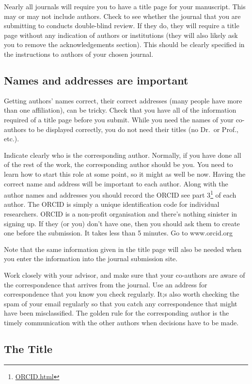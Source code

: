 \documentclass[
]{krantz}
\renewcommand{\href}[2]{#2\footnote{\url{#1}}}
\begin{document}
Nearly all journals will require you to have a title page for your manuscript. This may or may not include authors. Check to see whether the journal that you are submitting to conducts double-blind review. If they do, they will require a title page without any indication of authors or institutions (they will also likely ask you to remove the acknowledgements section). This should be clearly specified in the instructions to authors of your chosen journal.

\hypertarget{ORCID}{%
\subsection{Names and addresses are important}\label{ORCID}}

Getting authors' names correct, their correct addresses (many people have more than one affiliation), can be tricky. Check that you have all of the information required of a title page before you submit. While you need the names of your co-authors to be displayed correctly, you do not need their titles (no Dr.~or Prof., etc.).

Indicate clearly who is the corresponding author. Normally, if you have done all of the rest of the work, the corresponding author should be you. You need to learn how to start this role at some point, so it might as well be now. Having the correct name and address will be important to each author. Along with the author names and addresses you should record the ORCID \href{ORCID.html}{see part 3} of each author. The ORCID is simply a unique identification code for individual researchers. ORCID is a non-profit organisation and there's nothing sinister in signing up. If they (or you) don't have one, then you should ask them to create one before the submission. It takes less than 5 minutes. Go to www.orcid.org

Note that the same information given in the title page will also be needed when you enter the information into the journal submission site.

Work closely with your advisor, and make sure that your co-authors are aware of the correspondence that arrives from the journal. Use an address for correspondence that you know you check regularly. It;s also worth checking the spam of your email regularly so that you catch any correspondence that might have been misclassified. The golden rule for the corresponding author is the timely communication with the other authors when decisions have to be made.

\hypertarget{the-title}{%
\subsection{The Title}\label{the-title}}
\end{document}
